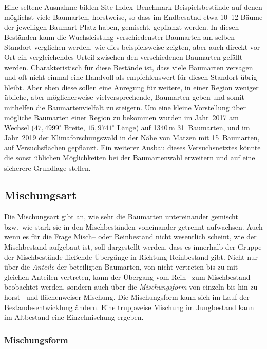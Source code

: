 \documentclass[twocolumn]{scrartcl}
\begin{document}
Eine seltene Ausnahme bilden Site-Index--Benchmark Beispielsbestände
auf denen möglichst viele Baumarten, horstweise, so dass im Endbesatnd
etwa 10--12 Bäume der jeweiligen Baumart Platz haben, gemischt,
gepflanzt werden. In diesen Beständen kann die Wuchsleistung
verschiedenster Baumarten am selben Standort verglichen werden, wie
dies beispielsweise \cite{mayer1970anbauversuch} zeigten, aber auch
direckt vor Ort ein vergleichendes Urteil zwischen den verschiedenen
Baumarten gefällt werden. Charakteristisch für diese Bestände ist,
dass viele Baumarten versagen und oft nicht einmal eine Handvoll als
empfehlenswert für diesen Standort übrig bleibt. Aber eben diese
sollen eine Anregung für weitere, in einer Region weniger übliche,
aber möglicherweise vielversprechende, Baumarten geben und somit
mithelfen die Baumartenvielfalt zu steigern. Um eine kleine
Vorstellung über mögliche Baumarten einer Region zu bekommen wurden im
Jahr~2017 am Wechsel ($47,4999^{\circ}$ Breite, $15,9741^{\circ}$
Länge) auf 1340\,m 31~Baumarten, und im Jahr~2019 der
Klimaforschungswald in der Nähe von Matzen mit 15~Baumarten, auf
Versuchsflächen gepflanzt. Ein weiterer Ausbau dieses Versuchsnetztes
könnte die sonst üblichen Möglichkeiten bei der Baumartenwahl
erweitern und auf eine sicherere Grundlage stellen.

\subsection{Mischungsart}
\label{ssec:mischugnsart}

Die Mischungsart gibt an, wie sehr die Baumarten untereinander
gemischt bzw.\ wie stark sie in den Mischbeständen voneinander
getrennt aufwachsen. Auch wenn es für die Frage Misch-- oder
Reinbestand nicht wesentlich scheint, wie der Mischbestand aufgebaut
ist, soll dargestellt werden, dass es innerhalb der Gruppe der
Mischbestände fließende Übergänge in Richtung Reinbestand gibt. Nicht
nur über die \emph{Anteile} der beteiligten Baumarten, von nicht
vertreten bis zu mit gleichen Anteilen vertreten, kann der Übergang
vom Rein-- zum Mischbestand beobachtet werden, sondern auch über die
\emph{Mischungsform} von einzeln bis hin zu horst-- und flächenweiser
Mischung. Die Mischungsform kann sich im Lauf der Bestandesentwicklung
ändern. Eine truppweise Mischung im Jungbestand kann im Altbestand
eine Einzelmischung ergeben.

\subsubsection{Mischungsform}
\label{sssec:mischungsform}
\end{document}

